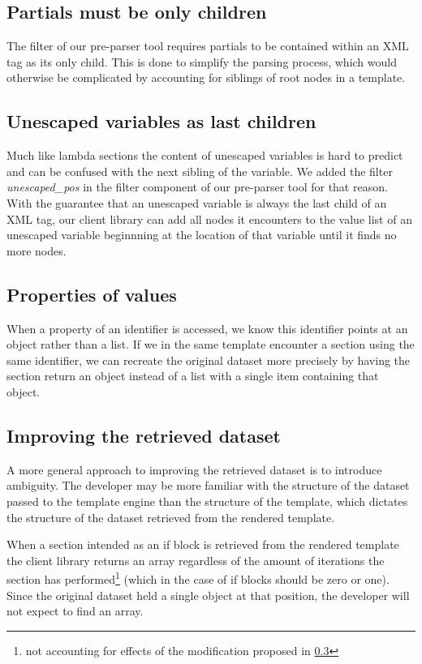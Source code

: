 \documentclass[thesis.tex]{subfiles}
\begin{document}
\subsection{Partials must be only children}
\label{sec:partial-only-child}
The filter of our pre-parser tool requires partials to be contained within an
XML tag as its only child. This is done to simplify the parsing process, which
would otherwise be complicated by accounting for siblings of root nodes in
a template.

\subsection{Unescaped variables as last children}
\label{sec:unescaped-variable-filter}
Much like lambda sections the content of unescaped variables is hard to predict
and can be confused with the next sibling of the variable. We added the filter
\emph{unescaped\_pos} in the filter component of our pre-parser tool for that
reason. With the guarantee that an unescaped variable is always the last child
of an XML tag, our client library can add all nodes it encounters to the value
list of an unescaped variable beginnning at the location of that variable until
it finds no more nodes.

\subsection{Properties of values}
\label{sec:flatten-section}
When a property of an identifier is accessed, we know this identifier points at
an object rather than a list. If we in the same template encounter a section
using the same identifier, we can recreate the original dataset more precisely
by having the section return an object instead of a list with a single item
containing that object.

\subsection{Improving the retrieved dataset}
A more general approach to improving the retrieved dataset is to introduce
ambiguity. The developer may be more familiar with the structure of the dataset
passed to the template engine than the structure of the template, which dictates
the structure of the dataset retrieved from the rendered template.

When a section intended as an if block is retrieved from the rendered template
the client library returns an array regardless of the amount of iterations the
section has performed\footnote{
	not accounting for effects of the modification proposed in \ref{sec:flatten-section}
} (which in the case of if blocks should be zero or one).
Since the original dataset held a single object at that position,
the developer will not expect to find an array.
\end{document}
